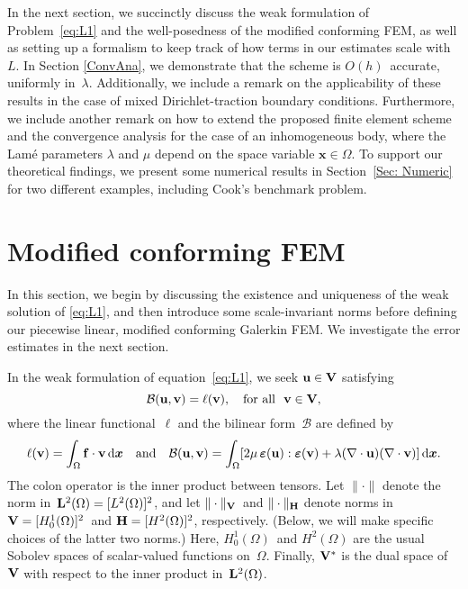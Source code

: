 \documentclass[11pt]{article}
\newcommand{\calB}{\mathcal{B}}
\newcommand{\vf}{{\bf f}}
\newcommand{\vu}{{\bf u}}
\newcommand{\vv}{{\bf v}}
\newcommand{\vV}{{\bf V}}
\newcommand{\vH}{{\bf H}}
\newcommand{\bsx}{{\boldsymbol{x}}}
\numberwithin{equation}{section}
\newcommand{\veps}{{\boldsymbol{\varepsilon}}}
\newcommand{\ud}{\mathrm{d}}
\begin{document}
In the next section, we succinctly discuss the weak formulation of
Problem~\eqref{eq:L1} and the well-posedness of the modified conforming FEM, as
well as setting up a formalism to keep track of how terms in our estimates
scale with~$L$. In Section \ref{ConvAna}, we demonstrate that the
scheme is $O(h)$~accurate, uniformly in~$\lambda$. Additionally, we include a remark on the applicability of these results in the case of mixed Dirichlet-traction boundary conditions. Furthermore, we include another remark on how to extend the proposed finite element scheme and the convergence analysis for the case of an inhomogeneous body, where  the Lam\'e parameters $\lambda$ and $\mu$ depend on the space variable $\bsx \in \Omega$.  
To support our theoretical findings, we present some numerical results in Section~\ref{Sec: Numeric} for two different examples,  including Cook's benchmark problem.
\section{Modified conforming FEM}\label{Sec: FEM}
In this section, we begin by discussing the existence and uniqueness of the
weak solution of \eqref{eq:L1}, and then introduce some scale-invariant
norms before defining our piecewise linear, modified conforming Galerkin FEM.
We investigate the error estimates in the next section.

In the weak formulation of  equation~\eqref{eq:L1}, we seek $\vu \in \vV$
satisfying
\begin{equation}\label{para weak}
 \calB(\vu, \vv) = \ell(\vv), \quad \text{for all~~$\vv \in \vV$,}
\end{equation}
where the linear functional~$\ell$ and the bilinear form~$\calB$ are defined by
\begin{equation*}\label{eq: bilinear}
\ell(\vv) = \int_\Omega \vf \cdot \vv \,\ud\bsx 
 \quad\text{and}\quad
\calB(\vu,\vv)=\int_\Omega[2\mu\,\veps(\vu):\veps(\vv)+\lambda(\nabla\cdot\vu)
(\nabla\cdot\vv)]\,\ud\bsx.
\end{equation*}
The colon operator is the inner product between tensors.  Let $\|\cdot\|$
denote the norm in~${\bf L}^2(\Omega)=[L^2(\Omega)]^2$, and let
$\|\cdot\|_{\vV}$~and $\|\cdot\|_{\vH}$ denote norms in
$\vV=[H^1_0(\Omega)]^2$~and ${\vH}=[H^2(\Omega)]^2$, respectively.  (Below, we
will make specific choices of the latter two norms.) Here, $H^1_0(\Omega)$~and
$H^2(\Omega)$ are the usual Sobolev spaces of scalar-valued functions on~$\Omega$.  Finally, $\vV^*$ is the 
dual space of~$\vV$ with respect to the inner product in~${\bf L}^2(\Omega)$. 
 
\end{document}
